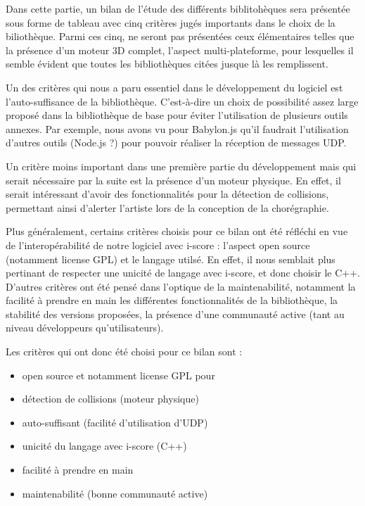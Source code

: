 
Dans cette partie, un bilan de l'étude des différents biblitohèques sera présentée sous forme de tableau avec cinq critères jugés importants dans le choix de la biliothèque. Parmi ces cinq, ne seront pas présentées ceux élémentaires telles que la présence d'un moteur 3D complet, l'aspect multi-plateforme, pour lesquelles il semble évident que toutes les bibliothèques citées jusque là les remplissent.

Un des critères qui nous a paru essentiel dans le développement du logiciel est l'auto-suffisance de la bibliothèque. C'est-à-dire un choix de possibilité assez large proposé dans la bibliothèque de base pour éviter l'utilisation de plusieurs outils annexes. Par exemple, nous avons vu pour Babylon.js qu'il faudrait l'utilisation d'autres outils (Node.js ?) pour pouvoir réaliser la réception de messages UDP. 

Un critère moins important dans une première partie du développement mais qui serait nécessaire par la suite est la présence d'un moteur physique. En effet, il serait intéressant d'avoir des fonctionnalités pour la détection de collisions, permettant ainsi d'alerter l'artiste lors de la conception de la chorégraphie.

Plus généralement, certains critères choisis pour ce bilan ont été réfléchi en vue de l'interopérabilité de notre logiciel avec i-score : l'aspect open source (notamment license GPL) et le langage utilsé. En effet, il nous semblait plus pertinant de respecter une unicité de langage avec i-score, et donc choisir le C++. 
D'autres critères ont été pensé dans l'optique de la maintenabilité, notamment la facilité à prendre en main les différentes fonctionnalités de la bibliothèque, la stabilité des versions proposées, la présence d'une communauté active (tant au niveau développeurs qu'utilisateurs).



Les critères qui ont donc été choisi pour ce bilan sont : 
\begin{itemize}
\item open source et notamment license GPL pour 
\item détection de collisions (moteur physique)
\item auto-suffisant (facilité d'utilisation d'UDP)
\item unicité du langage avec i-score (C++)
\item facilité à prendre en main
\item maintenabilité (bonne communauté active)
\end{itemize} 
 


